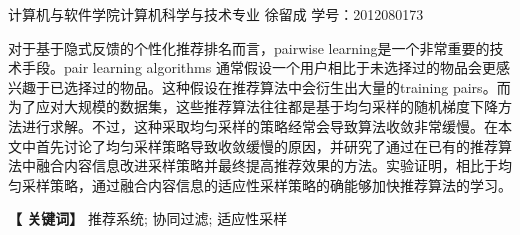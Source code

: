 \newpage

\centerline{\fangsong\bf{}}


\vskip 1cm

\begin{center}
	\kaishu
	\hspace{2cm}计算机与软件学院计算机科学与技术专业 \quad 徐留成 
	\vspace{5bp}
	\newline
	学号：2012080173
\end{center}

\vskip 10bp

{
\kaishu	
{} 
对于基于隐式反馈的个性化推荐排名而言，pairwise learning是一个非常重要的技术手段。pair learning algorithms 通常假设一个用户相比于未选择过的物品会更感兴趣于已选择过的物品。这种假设在推荐算法中会衍生出大量的training pairs。而为了应对大规模的数据集，这些推荐算法往往都是基于均匀采样的随机梯度下降方法进行求解。不过，这种采取均匀采样的策略经常会导致算法收敛非常缓慢。在本文中首先讨论了均匀采样策略导致收敛缓慢的原因，并研究了通过在已有的推荐算法中融合内容信息改进采样策略并最终提高推荐效果的方法。实验证明，相比于均匀采样策略，通过融合内容信息的适应性采样策略的确能够加快推荐算法的学习。

\vskip 10bp

\hspace{5bp} {\textbf{【 关键词】}} 
推荐系统; 协同过滤; 适应性采样  
}